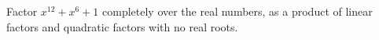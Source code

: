 Factor $x^{12}+x^6+1$ completely over the real numbers, as a product of linear factors and quadratic factors with no real roots.

